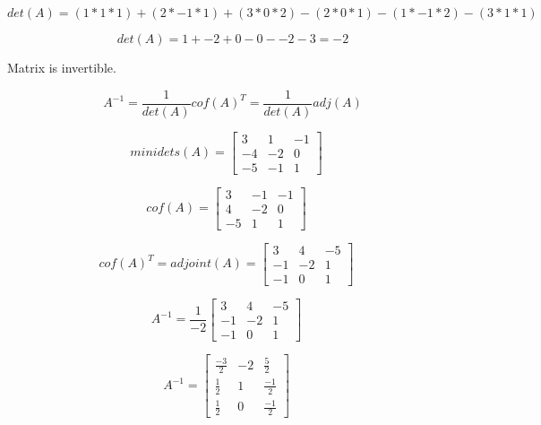 \documentclass[12pt]{article}
\begin{document}
$$det(A) = (1 * 1 * 1 )+ (2 * -1 *1) + (3* 0 * 2) - (2*0*1) - (1 *-1 * 2) - (3* 1 * 1)$$

$$det(A) = 1+ -2 + 0 - 0 - -2 - 3 = -2$$

Matrix is invertible.

$$A^{-1} = \frac{1}{det(A)} cof(A)^T = \frac{1}{det(A)} adj(A)$$

$$
minidets(A) = 
\begin{bmatrix} 
3 & 1 & -1 \\
-4 & -2 & 0 \\
-5 & -1 & 1
\end{bmatrix}
\quad
$$

$$
cof(A) = 
\begin{bmatrix} 
3 & -1 & -1 \\
4 & -2 & 0 \\
-5 & 1 & 1
\end{bmatrix}
\quad
$$



$$
cof(A)^T = adjoint(A) = 
\begin{bmatrix} 
3 & 4 & -5 \\
-1 & -2 & 1 \\
-1 & 0 & 1
\end{bmatrix}
\quad
$$

$$
A^{-1} = 
\frac{1}{-2}
\begin{bmatrix} 
3 & 4 & -5 \\
-1 & -2 & 1 \\
-1 & 0 & 1
\end{bmatrix}
\quad
$$

$$
A^{-1} = 
\begin{bmatrix} 
\frac{-3}{2} & -2 & \frac{5}{2} \\
\frac{1}{2} & 1 & \frac{-1}{2} \\
\frac{1}{2} & 0 & \frac{-1}{2}
\end{bmatrix}
\quad
$$
\end{document}
